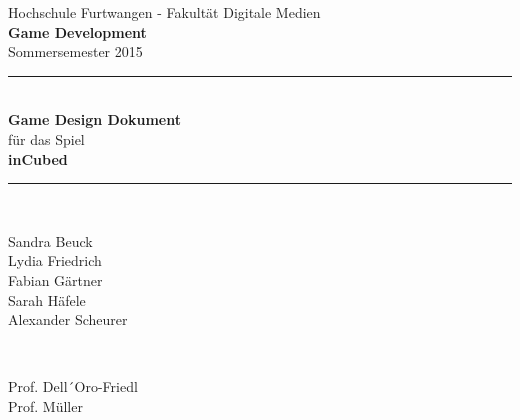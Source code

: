 \begin{titlepage}

\newcommand{\HRule}{\rule{\linewidth}{0.5mm}} %

\center %
 

\Large Hochschule Furtwangen - Fakultät Digitale Medien\\[0.5cm] %
{\Large \bfseries Game Development}\\[0.5cm] %
\large Sommersemester 2015\\[0.5cm] %


\HRule \\[0.2cm]
{ \huge \bfseries Game Design Dokument}\\ \vfill 
{ \normalsize für das Spiel}\\ \vfill 
{\huge \bfseries inCubed }\\[0cm] %
\HRule \\[0.7cm]
 

\begin{minipage}{0.55\textwidth}
\begin{flushleft} \large
\begin{singlespace}
Sandra Beuck\\
Lydia Friedrich\\
Fabian Gärtner\\
Sarah Häfele\\
Alexander Scheurer\\

\end{singlespace}
\end{flushleft}
\end{minipage}
~
\begin{minipage}{0.4\textwidth}
\begin{flushright} \large
Prof. Dell´Oro-Friedl\\
Prof. Müller\ %
\end{flushright}
\end{minipage}\\[2cm]


\end{titlepage}
